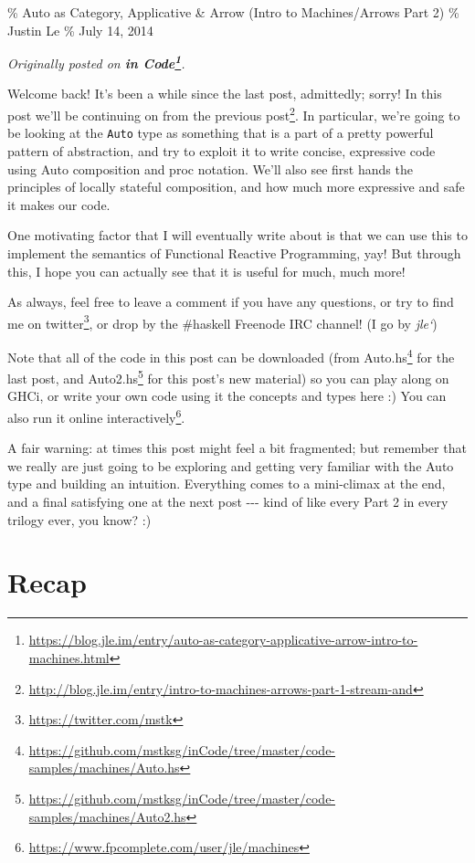 \documentclass[]{article}
\renewcommand{\href}[2]{#2\footnote{\url{#1}}}
\begin{document}
\% Auto as Category, Applicative \& Arrow (Intro to Machines/Arrows Part 2) \%
Justin Le \% July 14, 2014

\emph{Originally posted on
\textbf{\href{https://blog.jle.im/entry/auto-as-category-applicative-arrow-intro-to-machines.html}{in
Code}}.}

Welcome back! It's been a while since the last post, admittedly; sorry! In this
post we'll be continuing on from
\href{http://blog.jle.im/entry/intro-to-machines-arrows-part-1-stream-and}{the
previous post}. In particular, we're going to be looking at the \texttt{Auto}
type as something that is a part of a pretty powerful pattern of abstraction,
and try to exploit it to write concise, expressive code using Auto composition
and proc notation. We'll also see first hands the principles of locally stateful
composition, and how much more expressive and safe it makes our code.

One motivating factor that I will eventually write about is that we can use this
to implement the semantics of Functional Reactive Programming, yay! But through
this, I hope you can actually see that it is useful for much, much more!

As always, feel free to leave a comment if you have any questions, or try to
find me on \href{https://twitter.com/mstk}{twitter}, or drop by the \#haskell
Freenode IRC channel! (I go by \emph{jle`})

Note that all of the code in this post can be downloaded (from
\href{https://github.com/mstksg/inCode/tree/master/code-samples/machines/Auto.hs}{Auto.hs}
for the last post, and
\href{https://github.com/mstksg/inCode/tree/master/code-samples/machines/Auto2.hs}{Auto2.hs}
for this post's new material) so you can play along on GHCi, or write your own
code using it the concepts and types here :) You can also run it
\href{https://www.fpcomplete.com/user/jle/machines}{online interactively}.

A fair warning: at times this post might feel a bit fragmented; but remember
that we really are just going to be exploring and getting very familiar with the
Auto type and building an intuition. Everything comes to a mini-climax at the
end, and a final satisfying one at the next post -\/-\/- kind of like every Part
2 in every trilogy ever, you know? :)

\section{Recap}
\end{document}
